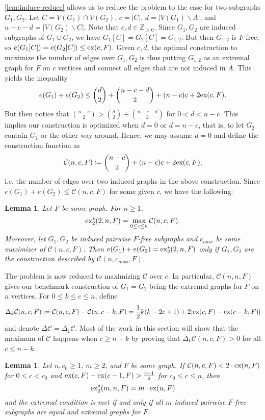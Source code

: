 \documentclass[12pt]{report}
\newtheorem{lemma}[theorem]{Lemma}
\newcommand*{\Z}{\mathbb{Z}}
\newcommand*{\ex}{\textnormal{ex}}
\newcommand*{\dex}{\textnormal{ex}_2}
\newcommand*{\con}{\mathcal{C}}
\begin{document}
\cref{lem:induce-reduce} allows us to reduce the problem to the case for two subgraphs $G_1, G_2$. Let $C = V(G_1) \cap V(G_2)$, $c = |C|$, $d = |V(G_1) \backslash A|$, and $n - c - d = |V(G_2) \backslash C|$. Note that $c, d \in \Z_{\geq 0}$. Since $G_1, G_2$ are induced subgraphs of $G_1 \cup G_2$, we have $G_1[C] = G_2[C] = G_{1, 2}$. But then $G_{1, 2}$ is $F$-free, so $e(G_1[C]) = e(G_2[C]) \leq \ex(c, F)$. Given $c, d$, the optimal construction to maximize the number of edges over $G_1, G_2$ is thus putting $G_{1, 2}$ as an extremal graph for $F$ on $c$ vertices and connect all edges that are not induced in $A$. This yields the inequality
\[
  e(G_1) + e(G_2) \leq \binom{d}{2} + \binom{n - c - d}{2} + (n - c)c + 2\ex(c, F).
\]
But then notice that $\binom{n - c}{2} > \binom{d}{2} + \binom{n - c - d}{2}$ for $0 < d < n - c$. This implies our construction is optimized when $d = 0$ or $d = n - c$, that is, to let $G_2$ contain $G_1$ or the other way around. Hence, we may assume $d = 0$ and define the construction function as
\[
  \con(n, c, F) \coloneq \binom{n - c}{2} + (n - c)c + 2\ex(c, F),
\]
i.e. the number of edges over two induced graphs in the above construction. Since $e(G_1) + e(G_2) \leq \con(n, c, F)$ for some given $c$, we have the following:
\begin{lemma}\label{lem:optimize-con}
  Let $F$ be some graph. For $n \geq 1$,
  \[
    \dex^*(2, n, F) = \max_{0 \leq c \leq n} \con(n, c, F).
  \]
  Moreover, let $G_1, G_2$ be induced pairwise $F$-free subgraphs and $c_{max}$ be some maximizer of $\con(n, c, F)$. Then $e(G_1) + e(G_2) = \dex^*(2, n, F)$ only if $G_1, G_2$ are the construction described by $\con(n, c_{max}, F)$.
\end{lemma}

The problem is now reduced to maximizing $\con$ over $c$. In particular, $\con(n, n, F)$ gives our benchmark construction of $G_1 = G_2$ being the extremal graphs for $F$ on $n$ vertices. For $0 \leq k \leq c \leq n$, define
\[
  \Delta_k \con(n, c, F) \coloneq \con(n, c, F) - \con(n, c - k, F) = \frac{1}{2}k(k - 2c + 1) + 2[\ex(c, F) - \ex(c - k, F)]
\]
and denote $\Delta \con = \Delta_1 \con$. Most of the work in this section will show that the maximum of $\con$ happens when $c \geq n - k$ by proving that $\Delta_k \con(n, c, F) > 0$ for all $c \leq n - k$.

\begin{lemma}\label{lem:induce-cond}
  Let $n, c_0 \geq 1$, $m \geq 2$, and $F$ be some graph. If $\con(n, c, F)< 2 \cdot \ex(n, F)$ for $0 \leq c < c_0$ and $\ex(c, F) - \ex(c - 1, F) > \frac{c - 1}{2}$ for $c_0 \leq c \leq n$, then
  \[
    \dex^*(m, n, F) = m \cdot \ex(n, F)
  \]
  and the extremal condition is met if and only if all $m$ induced pairwise $F$-free subgraphs are equal and extremal graphs for $F$.
\end{lemma}
\end{document}
